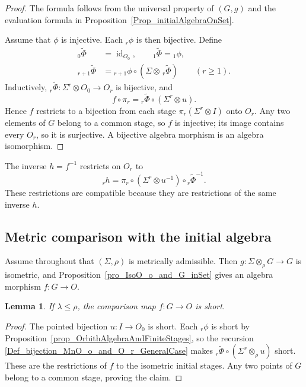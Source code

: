 \documentclass{sn-jnl}%
\theoremstyle{thmstyleone}%
\newtheorem{lemma}[theorem]{Lemma}%
\theoremstyle{thmstyletwo}%
\theoremstyle{thmstylethree}%
\newcommand{\M}{\Sigma}
\newcommand{\F}{\M\otimes}
\newcommand{\Fw}{\M\otimes_{\w}}
\newcommand{\Fwi}[1]{\M^{#1}\otimes_{\w}}
\newcommand{\Fi}[1]{\M^{#1}\otimes }
\newcommand{\f}{\phi}
\newcommand{\tf}{\tilde{\Phi}}
\newcommand{\w}{\rho}
\begin{document}
\begin{proof}
The formula follows from the universal property of $(G,g)$ and the evaluation formula in Proposition~\ref{Prop_initialAlgebraOnSet}.

Assume that $\f$ is injective. Each $ {}_r\f$ is then bijective. Define
\begin{align}
    {}_0\tf & = \operatorname{id}_{O_0},\qquad {}_1\tf={}_1\f,
    \label{Def_bijection_MnO_o_and_O_r}\\
    {}_{r+1}\tf&={}_{r+1}\f\circ(\F\,{}_r\tf) \qquad(r\geq1).
    \label{Def_bijection_MnO_o_and_O_r_GeneralCase}
\end{align}
Inductively, $ {}_r\tf:\Fi{r}O_0\to O_r$ is bijective, and
\begin{equation} 
\nonumber
    f\circ\pi_r={}_r\tf\circ(\Fi{r}u).
\end{equation}
Hence $f$ restricts to a bijection from each stage $\pi_r(\Fi{r}I)$ onto $O_r$. Any two elements of $G$ belong to a common stage, so $f$ is injective; its image contains every $O_r$, so it is surjective. A bijective algebra morphism is an algebra isomorphism.
\end{proof}

The inverse $h=f^{-1}$ restricts on $O_r$ to
\begin{equation} 
\nonumber
    {}_rh=\pi_r\circ(\Fi{r}u^{-1})\circ{}_r\tf^{-1}.
\end{equation}
These restrictions are compatible because they are restrictions of the same inverse $h$.

\subsection{Metric comparison with the initial algebra}

Assume throughout that $(\Sigma,\rho)$ is metrically admissible. Then $g:\Fw G\to G$ is isometric, and Proposition~\ref{pro_IsoO_o_and_G_inSet} gives an algebra morphism $f:G\to O$.

\begin{lemma}
\label{Lem_f_short}
    If $\lambda\leq\rho$, the comparison map $f:G\to O$ is short.
\end{lemma}

\begin{proof}
The pointed bijection $u:I\to O_0$ is short. Each ${}_r\f$ is short by Proposition~\ref{prop_OrbithAlgebraAndFiniteStages}, so the recursion \eqref{Def_bijection_MnO_o_and_O_r_GeneralCase} makes ${}_r\tf\circ(\Fwi{r}u)$ short. These are the restrictions of $f$ to the isometric initial stages. Any two points of $G$ belong to a common stage, proving the claim.
\end{proof}
\end{document}
